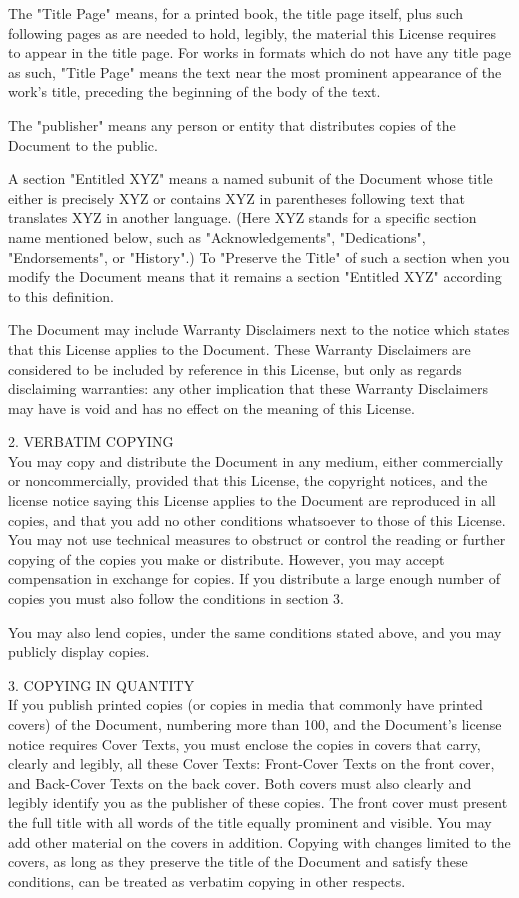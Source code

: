 \documentclass[oneside,12pt]{memoir} %
\begin{document}
The "Title Page" means, for a printed book, the title page itself, plus such following pages as are needed to hold, legibly, the material this License requires to appear in the title page. For works in formats which do not have any title page as such, "Title Page" means the text near the most prominent appearance of the work's title, preceding the beginning of the body of the text.

The "publisher" means any person or entity that distributes copies of the Document to the public.

A section "Entitled XYZ" means a named subunit of the Document whose title either is precisely XYZ or contains XYZ in parentheses following text that translates XYZ in another language. (Here XYZ stands for a specific section name mentioned below, such as "Acknowledgements", "Dedications", "Endorsements", or "History".) To "Preserve the Title" of such a section when you modify the Document means that it remains a section "Entitled XYZ" according to this definition.

The Document may include Warranty Disclaimers next to the notice which states that this License applies to the Document. These Warranty Disclaimers are considered to be included by reference in this License, but only as regards disclaiming warranties: any other implication that these Warranty Disclaimers may have is void and has no effect on the meaning of this License.

2. VERBATIM COPYING\\

You may copy and distribute the Document in any medium, either commercially or noncommercially, provided that this License, the copyright notices, and the license notice saying this License applies to the Document are reproduced in all copies, and that you add no other conditions whatsoever to those of this License. You may not use technical measures to obstruct or control the reading or further copying of the copies you make or distribute. However, you may accept compensation in exchange for copies. If you distribute a large enough number of copies you must also follow the conditions in section 3.

You may also lend copies, under the same conditions stated above, and you may publicly display copies.

3. COPYING IN QUANTITY\\

If you publish printed copies (or copies in media that commonly have printed covers) of the Document, numbering more than 100, and the Document's license notice requires Cover Texts, you must enclose the copies in covers that carry, clearly and legibly, all these Cover Texts: Front-Cover Texts on the front cover, and Back-Cover Texts on the back cover. Both covers must also clearly and legibly identify you as the publisher of these copies. The front cover must present the full title with all words of the title equally prominent and visible. You may add other material on the covers in addition. Copying with changes limited to the covers, as long as they preserve the title of the Document and satisfy these conditions, can be treated as verbatim copying in other respects.
\end{document}
